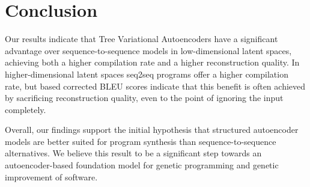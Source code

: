 \section{Conclusion}

Our results indicate that Tree Variational Autoencoders have a significant advantage over sequence-to-sequence models in low-dimensional latent spaces, achieving both a higher compilation rate and a higher reconstruction quality.
In higher-dimensional latent spaces seq2seq programs offer a higher compilation rate, but based corrected BLEU scores indicate that this benefit is often achieved by sacrificing reconstruction quality, even to the point of ignoring the input completely.

Overall, our findings support the initial hypothesis that structured autoencoder models are better suited for program synthesis than sequence-to-sequence alternatives.
We believe this result to be a significant step towards an autoencoder-based foundation model for genetic programming and genetic improvement of software.
